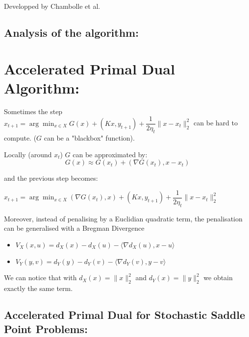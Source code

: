 \documentclass[12pt,reqno]{amsart}
\numberwithin{equation}{section}
\begin{document}
Developped by Chambolle et al.

\subsection{ Analysis of the algorithm: }


\section{ Accelerated Primal Dual Algorithm: }


Sometimes the step $x_{t+1} = \arg\min_{x \in X} G(x) + (Kx,y_{t+1}) + \dfrac{1}{2\eta_{t}}\lVert x - x_{t} \rVert_{2}^{2}$ can be hard to compute.
($G$ can be a "blackbox" function).

Locally (around $x_{t}$) $G$ can be approximated by:
$$
G(x) \approx G(x_{t}) + (\nabla G(x_{t}),x - x_{t})
$$

and the previous step becomes:

$x_{t+1} = \arg\min_{x \in X} (\nabla G(x_{t}),x) + (Kx,y_{t+1}) + \dfrac{1}{2\eta_{t}}\lVert x - x_{t} \rVert_{2}^{2}$

Moreover, instead of penalising by a Euclidian quadratic term, the penalisation can be generalised with a Bregman Divergence

\begin{itemize}
\item $V_{X}(x,u) = d_{X}(x) -  d_{X}(u) - \langle \nabla d_{X}(u),x - u \rangle$
\item $V_{Y}(y,v) = d_{Y}(y) -  d_{Y}(v) - \langle \nabla d_{Y}(v),y - v \rangle$
\end{itemize}

We can notice that with $d_{X}(x) = \lVert x \rVert_{2}^{2}$ and $d_{Y}(x) = \lVert y \rVert_{2}^{2}$ we obtain exactly the same term.

\subsection{Accelerated Primal Dual for Stochastic Saddle Point Problems:}
\end{document}
